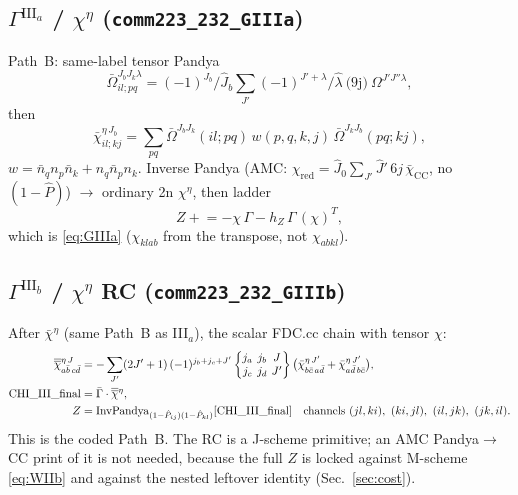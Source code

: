 \documentclass[enabledeprecatedfontcommands]{scrartcl}
\newcommand{\codename}[1]{\texttt{#1}}
\newcommand{\sixj}[6]{\begingroup\setlength{\arraycolsep}{0.2em}%
  \begin{Bmatrix} #1 & #2 & #3 \\ #4 & #5 & #6 \end{Bmatrix}\endgroup}
\begin{document}
\subsection{$\Gamma^{\mathrm{III}_a}$ / $\chi^\eta$
(\codename{comm223\_232\_GIIIa})}
\label{sec:js-GIIIa}

Path~B: same-label tensor Pandya
\begin{equation}\label{eq:js-pandya-tensor}
\bar\Omega^{J_b J_k\lambda}_{il;pq}
=(-1)^{J_b}/\hat J_b
\sum_{J'}(-1)^{J'+\lambda}/\hat\lambda
\ \text{(9j)}\
\Omega^{J'J''\lambda},
\end{equation}
then
\begin{equation}\label{eq:js-chieta}
\bar\chi^{\eta\,J_b}_{il;kj}
=\sum_{pq}
\bar\Omega^{J_b J_k}(il;pq)\,
w(p,q,k,j)\,
\bar\Omega^{J_k J_b}(pq;kj),
\end{equation}
$w=\bar n_q n_p\bar n_k+n_q\bar n_p n_k$.
Inverse Pandya (AMC: $\chi_{\mathrm{red}}=\hat J_0\sum_{J'}\hat J'\,6j\,\bar\chi_{\mathrm{CC}}$,
no $(1-\hat P)$) $\to$ ordinary 2n $\chi^\eta$, then ladder
\begin{equation}\label{eq:js-GIIIa}
Z
\mathrel{+}=
-\chi\,\Gamma
-h_Z\,\Gamma\,(\chi)^{T},
\end{equation}
which is \eqref{eq:GIIIa} ($\chi_{klab}$ from the transpose, not
$\chi_{abkl}$).

\subsection{$\Gamma^{\mathrm{III}_b}$ / $\chi^\eta$ RC
(\codename{comm223\_232\_GIIIb})}
\label{sec:js-GIIIb}

After $\bar\chi^\eta$ (same Path~B as III$_a$), the scalar FDC.cc chain
with tensor $\chi$:
\begin{equation}\label{eq:js-GIIIb}
\begin{aligned}
\overline{\overline\chi}{}^{\eta\,J}_{a\bar b\,c\bar d}
&=-\sum_{J'}(2J'+1)\,(-1)^{j_b+j_c+J'}
\sixj{j_a}{j_b}{J}{j_c}{j_d}{J'}
\bigl(\bar\chi^{\eta\,J'}_{b\bar c\,a\bar d}
+\bar\chi^{\eta\,J'}_{a\bar d\,b\bar c}\bigr),\\
\mathrm{CHI\_III\_final}
&=\bar\Gamma\cdot\overline{\overline\chi}{}^\eta,\\
Z
&=\mathrm{InvPandya}_{(1-\hat P_{ij})(1-\hat P_{kl})}
  [\mathrm{CHI\_III\_final}]
\quad\text{channels }(jl,ki),\ (ki,jl),\ (il,jk),\ (jk,il).
\end{aligned}
\end{equation}
This is the coded Path~B. The RC is a J-scheme primitive; an AMC
Pandya$\to$CC print of it is not needed, because the full $Z$ is locked
against M-scheme \eqref{eq:WIIb} and against the nested leftover identity
(Sec.~\ref{sec:cost}).
\end{document}
